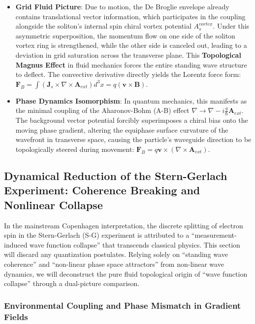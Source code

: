\documentclass[12pt, a4paper]{article}
\begin{document}
\begin{itemize}
    \item \textbf{Grid Fluid Picture}: Due to motion, the De Broglie envelope already contains translational vector information, which participates in the coupling alongside the soliton's internal spin chiral vortex potential $A_s^{vortex}$. Under this asymmetric superposition, the momentum flow on one side of the soliton vortex ring is strengthened, while the other side is canceled out, leading to a deviation in grid saturation across the transverse plane. This \textbf{Topological Magnus Effect} in fluid mechanics forces the entire standing wave structure to deflect. The convective derivative directly yields the Lorentz force form: $\mathbf{F}_B = \int (\mathbf{J}_s \times \nabla \times \mathbf{A}_{ext}) d^3x = q (\mathbf{v} \times \mathbf{B})$.
    \item \textbf{Phase Dynamics Isomorphism}: In quantum mechanics, this manifests as the minimal coupling of the Aharonov-Bohm (A-B) effect $\nabla \to \nabla - i \frac{q}{\hbar} \mathbf{A}_{ext}$. The background vector potential forcibly superimposes a chiral bias onto the moving phase gradient, altering the equiphase surface curvature of the wavefront in transverse space, causing the particle's waveguide direction to be topologically steered during movement: $\mathbf{F}_B = q \mathbf{v} \times (\nabla \times \mathbf{A}_{ext})$.
\end{itemize}

\subsection{Dynamical Reduction of the Stern-Gerlach Experiment: Coherence Breaking and Nonlinear Collapse}

In the mainstream Copenhagen interpretation, the discrete splitting of electron spin in the Stern-Gerlach (S-G) experiment is attributed to a ``measurement-induced wave function collapse'' that transcends classical physics. This section will discard any quantization postulates. Relying solely on ``standing wave coherence'' and ``non-linear phase space attractors'' from non-linear wave dynamics, we will deconstruct the pure fluid topological origin of ``wave function collapse'' through a dual-picture comparison.

\subsubsection{Environmental Coupling and Phase Mismatch in Gradient Fields}
\end{document}
